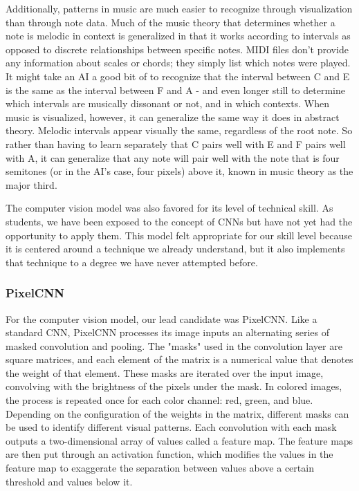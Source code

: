 Additionally, patterns in music are much easier to recognize through visualization than
through note data. Much of the music theory that determines whether a note is melodic in
context is generalized in that it works according to intervals as opposed to discrete
relationships between specific notes. MIDI files don't provide any information about
scales or chords; they simply list which notes were played. It might take an AI a good bit
of to recognize that the interval between C and E is the same as the interval between F
and A - and even longer still to determine which intervals are musically dissonant or not,
and in which contexts. When music is visualized, however, it can generalize the same way
it does in abstract theory. Melodic intervals appear visually the same, regardless of the
root note. So rather than having to learn separately that C pairs well with E and F pairs
well with A, it can generalize that any note will pair well with the note that is four
semitones (or in the AI's case, four pixels) above it, known in music theory as the major
third.

The computer vision model was also favored for its level of technical skill. As students,
we have been exposed to the concept of CNNs but have not yet had the opportunity to apply
them. This model felt appropriate for our skill level because it is centered around a
technique we already understand, but it also implements that technique to a degree we have
never attempted before.

\subsubsection{PixelCNN}

For the computer vision model, our lead candidate was PixelCNN. Like a standard CNN,
PixelCNN processes its image inputs an alternating series of masked convolution and
pooling. The "masks" used in the convolution layer are square matrices, and each element
of the matrix is a numerical value that denotes the weight of that element. These masks
are iterated over the input image, convolving with the brightness of the pixels under the
mask. In colored images, the process is repeated once for each color channel: red, green,
and blue. Depending on the configuration of the weights in the matrix, different masks can
be used to identify different visual patterns. Each convolution with each mask outputs a
two-dimensional array of values called a feature map. The feature maps are then put
through an activation function, which modifies the values in the feature map to exaggerate
the separation between values above a certain threshold and  values below it.

